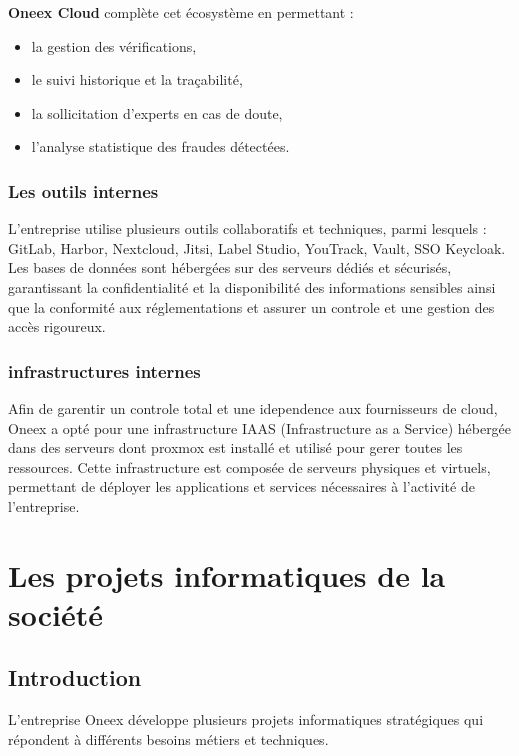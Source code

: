 \textbf{Oneex Cloud} complète cet écosystème en permettant :

\begin{itemize}
	\item la gestion des vérifications,
	\item le suivi historique et la traçabilité,
	\item la sollicitation d’experts en cas de doute,
	\item l’analyse statistique des fraudes détectées.
\end{itemize}

\subsubsection{Les outils internes}

L’entreprise utilise plusieurs outils collaboratifs et techniques, parmi lesquels :
GitLab, Harbor, Nextcloud, Jitsi, Label Studio, YouTrack, Vault, SSO Keycloak.
Les bases de données sont hébergées sur des serveurs dédiés et sécurisés, garantissant la confidentialité et la disponibilité des informations sensibles ainsi que la conformité aux réglementations et assurer un controle et une gestion des accès rigoureux.

\subsubsection{infrastructures internes}

Afin de garentir un controle total et une idependence aux fournisseurs de cloud, Oneex a opté pour une infrastructure IAAS (Infrastructure as a Service) hébergée dans des serveurs dont proxmox est installé et utilisé pour gerer toutes les ressources. Cette infrastructure est composée de serveurs physiques et virtuels, permettant de déployer les applications et services nécessaires à l’activité de l’entreprise.

\section{Les projets informatiques de la société}

\subsection{Introduction}

L’entreprise Oneex développe plusieurs projets informatiques stratégiques qui répondent à différents besoins métiers et techniques.

